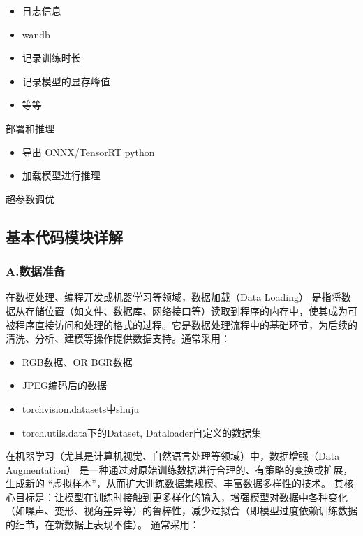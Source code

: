 \begin{description}
\begin{description}
		\begin{itemize}
			\item 日志信息
			\item wandb
			\item 记录训练时长
			\item 记录模型的显存峰值
			\item 等等
		\end{itemize}
	\end{description}
	\item[7.] 部署和推理
	\begin{itemize}
		\item 导出 ONNX/TensorRT python
		\item 加载模型进行推理
	\end{itemize}
	\item[8.] 超参数调优
\end{description}

\subsection{基本代码模块详解}

\subsubsection{A.数据准备}
在数据处理、编程开发或机器学习等领域，数据加载（Data Loading） 是指将数据从存储位置（如文件、数据库、网络接口等）读取到程序的内存中，使其成为可被程序直接访问和处理的格式的过程。它是数据处理流程中的基础环节，为后续的清洗、分析、建模等操作提供数据支持。通常采用：
\begin{itemize}
	\item RGB数据、OR BGR数据
	\item JPEG编码后的数据
	\item torchvision.datasets中shuju 
	\item torch.utils.data下的Dataset, Dataloader自定义的数据集
\end{itemize}

在机器学习（尤其是计算机视觉、自然语言处理等领域）中，数据增强（Data Augmentation） 是一种通过对原始训练数据进行合理的、有策略的变换或扩展，生成新的 “虚拟样本”，从而扩大训练数据集规模、丰富数据多样性的技术。
其核心目标是：让模型在训练时接触到更多样化的输入，增强模型对数据中各种变化（如噪声、变形、视角差异等）的鲁棒性，减少过拟合（即模型过度依赖训练数据的细节，在新数据上表现不佳）。
通常采用：

